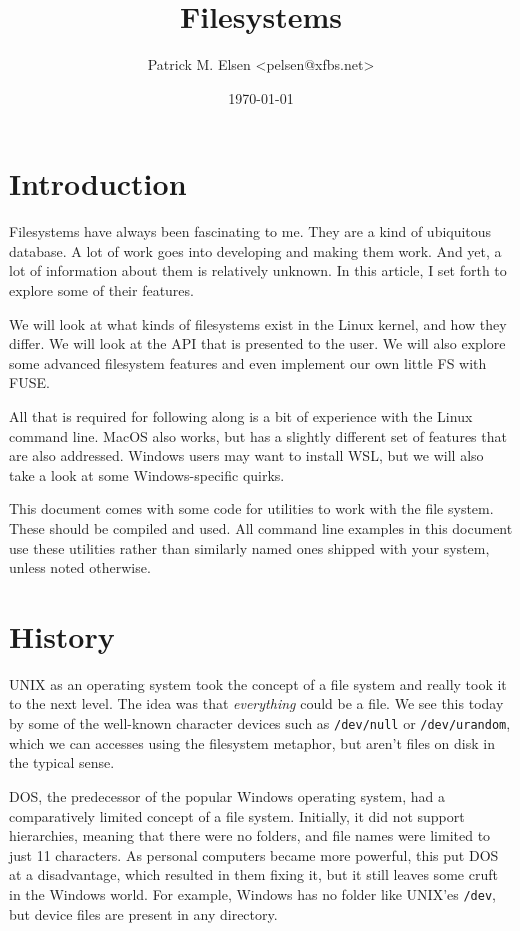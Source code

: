 \documentclass[a4paper]{article}
\title{Filesystems}
\author{Patrick M. Elsen <pelsen@xfbs.net>}
\date{\today}
\begin{document}
\maketitle

\tableofcontents

\section{Introduction}

Filesystems have always been fascinating to me. They are a kind of ubiquitous database. A lot of work goes into developing and making them work. And yet, a lot of information about them is relatively unknown. In this article, I set forth to explore some of their features.

We will look at what kinds of filesystems exist in the Linux kernel, and how they differ. We will look at the API that is presented to the user. We will also explore some advanced filesystem features and even implement our own little FS with FUSE.

All that is required for following along is a bit of experience with the Linux command line. MacOS also works, but has a slightly different set of features that are also addressed. Windows users may want to install WSL, but we will also take a look at some Windows-specific quirks.

This document comes with some code for utilities to work with the file system. These should be compiled and used. All command line examples in this document use these utilities rather than similarly named ones shipped with your system, unless noted otherwise.

\section{History}

UNIX as an operating system took the concept of a file system and really took it to the next level. The idea was that \emph{everything} could be a file. We see this today by some of the well-known character devices such as \verb|/dev/null| or \verb|/dev/urandom|, which we can accesses using the filesystem metaphor, but aren't files on disk in the typical sense.

DOS, the predecessor of the popular Windows operating system, had a comparatively limited concept of a file system. Initially, it did not support hierarchies, meaning that there were no folders, and file names were limited to just 11 characters. As personal computers became more powerful, this put DOS at a disadvantage, which resulted in them fixing it, but it still leaves some cruft in the Windows world. For example, Windows has no folder like UNIX’es \verb|/dev|, but device files are present in any directory.
\end{document}
